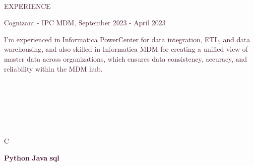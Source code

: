 \documentclass[12pt]{article}
\begin{document}
\\
\begin{justify}
\textcolor[HTML]{481A34}{EXPERIENCE}
\end{justify}
\begin{justify}
\textcolor[HTML]{481A34}{Cognizant - IPC MDM,} \textcolor[HTML]{481A34}{ } \textcolor[HTML]{481A34}{September} \textcolor[HTML]{481A34}{ } \textcolor[HTML]{481A34}{2023} \textcolor[HTML]{481A34}{ } \textcolor[HTML]{481A34}{-} \textcolor[HTML]{481A34}{ } \textcolor[HTML]{481A34}{April} \textcolor[HTML]{481A34}{ } \textcolor[HTML]{481A34}{2023}
\end{justify}
\begin{justify}
\textcolor[HTML]{481A34}{I'm experienced in Informatica PowerCenter for} \textcolor[HTML]{481A34}{ } \textcolor[HTML]{481A34}{data} \textcolor[HTML]{481A34}{ } \textcolor[HTML]{481A34}{integration,} \textcolor[HTML]{481A34}{ } \textcolor[HTML]{481A34}{ETL,} \textcolor[HTML]{481A34}{ } \textcolor[HTML]{481A34}{and} \textcolor[HTML]{481A34}{ } \textcolor[HTML]{481A34}{data} \textcolor[HTML]{481A34}{ } \textcolor[HTML]{481A34}{warehousing,} \textcolor[HTML]{481A34}{ } \textcolor[HTML]{481A34}{and} \textcolor[HTML]{481A34}{ } \textcolor[HTML]{481A34}{also skilled in Informatica MDM for creating a} \textcolor[HTML]{481A34}{ } \textcolor[HTML]{481A34}{unified} \textcolor[HTML]{481A34}{ } \textcolor[HTML]{481A34}{view} \textcolor[HTML]{481A34}{ } \textcolor[HTML]{481A34}{of} \textcolor[HTML]{481A34}{ } \textcolor[HTML]{481A34}{master} \textcolor[HTML]{481A34}{ } \textcolor[HTML]{481A34}{data} \textcolor[HTML]{481A34}{ } \textcolor[HTML]{481A34}{across} \textcolor[HTML]{481A34}{ } \textcolor[HTML]{481A34}{organizations,} \textcolor[HTML]{481A34}{ } \textcolor[HTML]{481A34}{which ensures data consistency, accuracy, and} \textcolor[HTML]{481A34}{ } \textcolor[HTML]{481A34}{reliability} \textcolor[HTML]{481A34}{ } \textcolor[HTML]{481A34}{within} \textcolor[HTML]{481A34}{ } \textcolor[HTML]{481A34}{the} \textcolor[HTML]{481A34}{ } \textcolor[HTML]{481A34}{MDM} \textcolor[HTML]{481A34}{ } \textcolor[HTML]{481A34}{hub.}
\end{justify}
\\
\\
\\
\\
\\
\begin{justify}
\textcolor[HTML]{481A34}{C}
\end{justify}
\begin{flushleft}
\textcolor[HTML]{481A34}{\textbf{Python}} \textcolor[HTML]{481A34}{\textbf{ }} \textcolor[HTML]{481A34}{\textbf{Java}} \textcolor[HTML]{481A34}{\textbf{ }} \textcolor[HTML]{481A34}{\textbf{sql}}
\end{flushleft}
\end{document}

